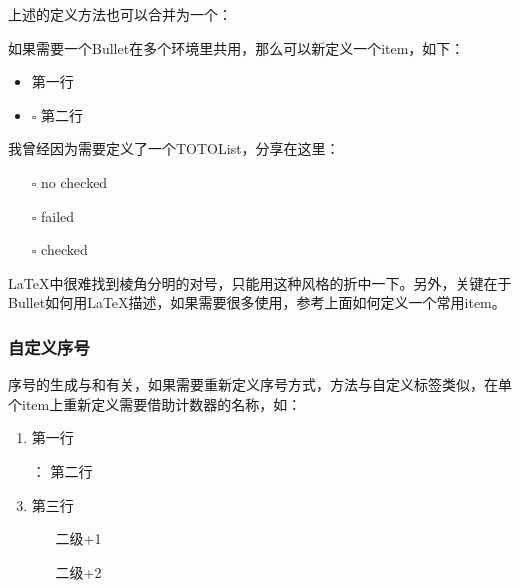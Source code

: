     上述的定义方法也可以合并为一个：
    \begin{texshow}
    \end{texshow}

    如果需要一个Bullet在多个环境里共用，那么可以新定义一个item，如下：
    \begin{texshow}
        \newcommand{\checkitem}{\item[$\square$]}%
        \begin{itemize}
            \item 第一行
            \checkitem 第二行
        \end{itemize}
    \end{texshow}

    我曾经因为需要定义了一个TOTOList，分享在这里：
    \begin{texshow}
        \begin{itemize}
            \item[$\square$]
            no checked
            \item[\rlap{\raisebox{0.3ex}{\hspace{0.4ex}\tiny \ding{52}}}$\square$]
            failed
            \item[\rlap{\raisebox{0.3ex}{\hspace{0.4ex}\scriptsize \ding{56}}}$\square$]
            checked
        \end{itemize}
    \end{texshow}
    \LaTeX{}中很难找到棱角分明的对号，只能用这种风格的折中一下。另外，关键在于Bullet如何用\LaTeX{}描述，如果需要很多使用，参考上面如何定义一个常用item。

    \subsubsection{自定义序号}
    序号的生成与和有关，如果需要重新定义序号方式，方法与自定义标签类似，在单个item上重新定义需要借助计数器的名称，如：
    \begin{texshow}
        \begin{enumerate}
            \item 第一行 
            \item[\alph{enumi}：] 第二行 
            \item 第三行 
            \begin{enumerate}
                \item[\roman{enumii}] 二级+1
                \item[\roman{enumii}] 二级+2 
            \end{enumerate}
        \end{enumerate}
    \end{texshow}

